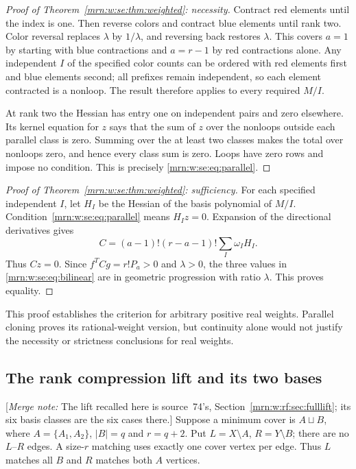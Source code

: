 \documentclass[11pt,a4paper]{article}
\theoremstyle{remark}\newtheorem{remark}[theorem]{Remark}
\newcommand{\mnote}[1]{[\textit{Merge note:} #1]}
\begin{document}
\begin{proof}[Proof of Theorem~\ref{mrn:w:se:thm:weighted}: necessity]
Contract red elements until the index is one. Then reverse colors and contract blue elements until rank two. Color reversal replaces $\lambda$ by $1/\lambda$, and reversing back restores $\lambda$. This covers $a=1$ by starting with blue contractions and $a=r-1$ by red contractions alone. Any independent $I$ of the specified color counts can be ordered with red elements first and blue elements second; all prefixes remain independent, so each element contracted is a nonloop. The result therefore applies to every required $M/I$.

At rank two the Hessian has entry one on independent pairs and zero elsewhere. Its kernel equation for $z$ says that the sum of $z$ over the nonloops outside each parallel class is zero. Summing over the at least two classes makes the total over nonloops zero, and hence every class sum is zero. Loops have zero rows and impose no condition. This is precisely \eqref{mrn:w:se:eq:parallel}.
\end{proof}

\begin{proof}[Proof of Theorem~\ref{mrn:w:se:thm:weighted}: sufficiency]
For each specified independent $I$, let $H_I$ be the Hessian of the basis polynomial of $M/I$. Condition~\eqref{mrn:w:se:eq:parallel} means $H_I z=0$. Expansion of the directional derivatives gives
\[
 C=(a-1)!(r-a-1)!\sum_I\omega_I H_I.
\]
Thus $Cz=0$. Since $f^TCg=r!P_a>0$ and $\lambda>0$, the three values in \eqref{mrn:w:se:eq:bilinear} are in geometric progression with ratio $\lambda$. This proves equality.
\end{proof}

This proof establishes the criterion for arbitrary positive real weights. Parallel cloning proves its rational-weight version, but continuity alone would not justify the necessity or strictness conclusions for real weights.

\subsection{The rank compression lift and its two bases}\label{mrn:w:se:sec:lift}
\mnote{The lift recalled here is source~74's, Section~\ref{mrn:w:rf:sec:fulllift}; its six basis classes are the six cases there.}
Suppose a minimum cover is $A\sqcup B$, where $A=\{A_1,A_2\}$, $|B|=q$ and $r=q+2$. Put $L=X\setminus A$, $R=Y\setminus B$; there are no $L$--$R$ edges. A size-$r$ matching uses exactly one cover vertex per edge. Thus $L$ matches all $B$ and $R$ matches both $A$ vertices.
\end{document}
